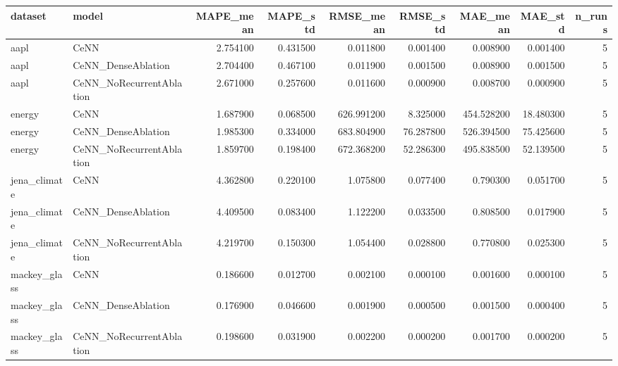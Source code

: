 \begin{tabular}{llrrrrrrr}
\toprule
dataset & model & MAPE_mean & MAPE_std & RMSE_mean & RMSE_std & MAE_mean & MAE_std & n_runs \\
\midrule
aapl & CeNN & 2.754100 & 0.431500 & 0.011800 & 0.001400 & 0.008900 & 0.001400 & 5 \\
aapl & CeNN_DenseAblation & 2.704400 & 0.467100 & 0.011900 & 0.001500 & 0.008900 & 0.001500 & 5 \\
aapl & CeNN_NoRecurrentAblation & 2.671000 & 0.257600 & 0.011600 & 0.000900 & 0.008700 & 0.000900 & 5 \\
energy & CeNN & 1.687900 & 0.068500 & 626.991200 & 8.325000 & 454.528200 & 18.480300 & 5 \\
energy & CeNN_DenseAblation & 1.985300 & 0.334000 & 683.804900 & 76.287800 & 526.394500 & 75.425600 & 5 \\
energy & CeNN_NoRecurrentAblation & 1.859700 & 0.198400 & 672.368200 & 52.286300 & 495.838500 & 52.139500 & 5 \\
jena_climate & CeNN & 4.362800 & 0.220100 & 1.075800 & 0.077400 & 0.790300 & 0.051700 & 5 \\
jena_climate & CeNN_DenseAblation & 4.409500 & 0.083400 & 1.122200 & 0.033500 & 0.808500 & 0.017900 & 5 \\
jena_climate & CeNN_NoRecurrentAblation & 4.219700 & 0.150300 & 1.054400 & 0.028800 & 0.770800 & 0.025300 & 5 \\
mackey_glass & CeNN & 0.186600 & 0.012700 & 0.002100 & 0.000100 & 0.001600 & 0.000100 & 5 \\
mackey_glass & CeNN_DenseAblation & 0.176900 & 0.046600 & 0.001900 & 0.000500 & 0.001500 & 0.000400 & 5 \\
mackey_glass & CeNN_NoRecurrentAblation & 0.198600 & 0.031900 & 0.002200 & 0.000200 & 0.001700 & 0.000200 & 5 \\
\bottomrule
\end{tabular}
